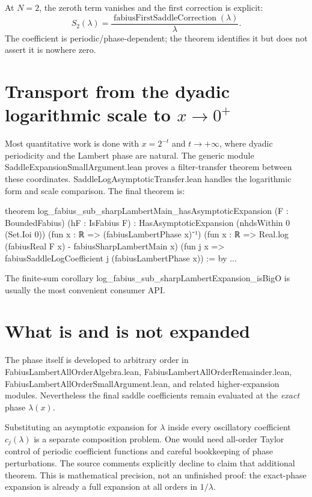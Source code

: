 \documentclass[11pt,a4paper,openany]{book}
\def\module#1{#1.lean}
\def\decl#1{#1}
\newcommand{\module}[1]{\nolinkurl{#1.lean}}
\newcommand{\decl}[1]{\texttt{\detokenize{#1}}}
\begin{document}
At $N=2$, the zeroth term vanishes and the first correction is explicit:
\[
 S_2(\lambda)=
 \frac{\operatorname{fabiusFirstSaddleCorrection}(\lambda)}{\lambda}.
\]
The coefficient is periodic/phase-dependent; the theorem identifies it but
does not assert it is nowhere zero.

\section{Transport from the dyadic logarithmic scale to \texorpdfstring{$x\to0^+$}{x to 0+}}
Most quantitative work is done with $x=2^{-t}$ and $t\to+\infty$, where dyadic
periodicity and the Lambert phase are natural.  The generic module
\module{SaddleExpansionSmallArgument} proves a filter-transfer theorem between
these coordinates.  \module{SaddleLogAsymptoticTransfer} handles the logarithmic
form and scale comparison.  The final theorem is:

\begin{LeanCode}
theorem log_fabius_sub_sharpLambertMain_hasAsymptoticExpansion
    (F : BoundedFabius) (hF : IsFabius F) :
    HasAsymptoticExpansion (nhdsWithin 0 (Set.Ioi 0))
      (fun x : ℝ => (fabiusLambertPhase x)⁻¹)
      (fun x : ℝ => Real.log (fabiusReal F x) -
        fabiusSharpLambertMain x)
      (fun j x => fabiusSaddleLogCoefficient j
        (fabiusLambertPhase x)) := by
  ...
\end{LeanCode}

The finite-sum corollary
\decl{log_fabius_sub_sharpLambertExpansion_isBigO} is usually the most convenient
consumer API.

\section{What is and is not expanded}
The phase itself is developed to arbitrary order in
\module{FabiusLambertAllOrderAlgebra},
\module{FabiusLambertAllOrderRemainder},
\module{FabiusLambertAllOrderSmallArgument}, and related higher-expansion
modules.  Nevertheless the final saddle coefficients remain evaluated at the
\emph{exact} phase $\lambda(x)$.

Substituting an asymptotic expansion for $\lambda$ inside every oscillatory
coefficient $c_j(\lambda)$ is a separate composition problem.  One would need
all-order Taylor control of periodic coefficient functions and careful
bookkeeping of phase perturbations.  The source comments explicitly decline to
claim that additional theorem.  This is mathematical precision, not an
unfinished proof: the exact-phase expansion is already a full expansion at
all orders in $1/\lambda$.
\end{document}
